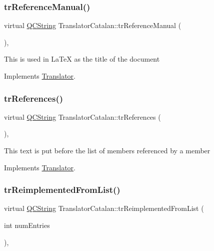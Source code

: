 \subsubsection{\texorpdfstring{trReferenceManual()}{trReferenceManual()}}
{\footnotesize\ttfamily virtual \mbox{\hyperlink{class_q_c_string}{Q\+C\+String}} Translator\+Catalan\+::tr\+Reference\+Manual (\begin{DoxyParamCaption}{ }\end{DoxyParamCaption})\hspace{0.3cm}{\ttfamily [inline]}, {\ttfamily [virtual]}}

This is used in La\+TeX as the title of the document 

Implements \mbox{\hyperlink{class_translator}{Translator}}.

\mbox{\label{class_translator_catalan_abf87624771522efa1057b9b60fcadf3a}} 
\subsubsection{\texorpdfstring{trReferences()}{trReferences()}}
{\footnotesize\ttfamily virtual \mbox{\hyperlink{class_q_c_string}{Q\+C\+String}} Translator\+Catalan\+::tr\+References (\begin{DoxyParamCaption}{ }\end{DoxyParamCaption})\hspace{0.3cm}{\ttfamily [inline]}, {\ttfamily [virtual]}}

This text is put before the list of members referenced by a member 

Implements \mbox{\hyperlink{class_translator}{Translator}}.

\mbox{\label{class_translator_catalan_af0b6cb39ae12b445066b4aa2656f77e5}} 
\subsubsection{\texorpdfstring{trReimplementedFromList()}{trReimplementedFromList()}}
{\footnotesize\ttfamily virtual \mbox{\hyperlink{class_q_c_string}{Q\+C\+String}} Translator\+Catalan\+::tr\+Reimplemented\+From\+List (\begin{DoxyParamCaption}\item[{int}]{num\+Entries }\end{DoxyParamCaption})\hspace{0.3cm}{\ttfamily [inline]}, {\ttfamily [virtual]}}

